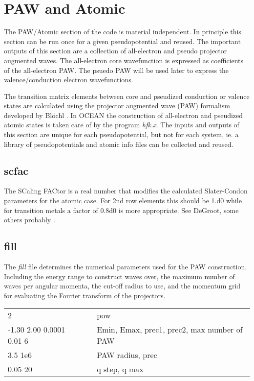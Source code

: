 \documentclass[12pt]{article}
\begin{document}
\section{PAW and Atomic}

The PAW/Atomic section of the code is material independent. In principle this section can be run once
for a given pseudopotential and reused. The important outputs of this section are a collection of 
all-electron and pseudo projector augmented waves. The all-electron core wavefunction is expressed
as coefficients of the all-electron PAW. The psuedo PAW will be used later to express the valence/conduction
electron wavefunctions.

The transition matrix elements between core and pseudized conduction or valence states are calculated 
using the projector augmented wave (PAW) formalism developed by Bl\"{o}chl \cite{Bloechl}. In OCEAN
the construction of all-electron and pseudized atomic states is taken care of by the program \emph{hfk.x}. 
The inputs and outputs of this section are unique for each pseudopotential, but not for each system, ie. 
a library of pseudopotentials and atomic info files can be collected and reused.


\subsection{scfac}
The SCaling FACtor is a real number that modifies the calculated Slater-Condon parameters for the atomic case. For 2nd row elements this should be 1.d0 while for transition metals a factor of 0.8d0 is more appropriate. See DeGroot, some others probably \cite{SCFAR}.

\subsection{fill}
The \emph{fill} file determines the numerical parameters used for the PAW construction. Including the energy range to construct waves over, the maximum number of waves per angular momenta, the cut-off radius to use, and the momentum grid for evaluating the Fourier transform of the projectors. 

\begin{center}
\begin{tabular}{| l | c l |}
\hline
2						& &  pow \\
-1.30 2.00 0.0001 0.01 6		& & Emin, Emax, prec1, prec2, max number of PAW \\
3.5 1e6					& & PAW radius, prec \\
0.05 20					& & q step, q max \\
\hline
\end{tabular}
\end{center}
\end{document}
